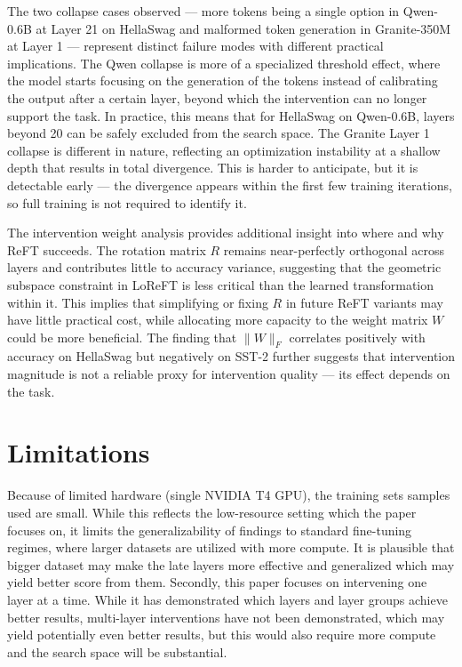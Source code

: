 \documentclass[conference]{IEEEtran}
\begin{document}
	The two collapse cases observed — more tokens being a single option in Qwen-0.6B at Layer 21 on HellaSwag and malformed token generation in Granite-350M at Layer 1 — represent distinct failure modes with different practical implications. The Qwen collapse is more of a specialized threshold effect, where the model starts focusing on the generation of the tokens instead of calibrating the output after a certain layer, beyond which the intervention can no longer support the task. In practice, this means that for HellaSwag on Qwen-0.6B, layers beyond 20 can be safely excluded from the search space. The Granite Layer 1 collapse is different in nature, reflecting an optimization instability at a shallow depth that results in total divergence. This is harder to anticipate, but it is detectable early — the divergence appears within the first few training iterations, so full training is not required to identify it.
	
	The intervention weight analysis provides additional insight into where and why ReFT succeeds. The rotation matrix $R$ remains near-perfectly orthogonal across layers and contributes little to accuracy variance, suggesting that the geometric subspace constraint in LoReFT is less critical than the learned transformation within it. This implies that simplifying or fixing $R$ in future ReFT variants may have little practical cost, while allocating more capacity to the weight matrix $W$ could be more beneficial. The finding that $\|W\|_F$ correlates positively with accuracy on HellaSwag but negatively on SST-2 further suggests that intervention magnitude is not a reliable proxy for intervention quality — its effect depends on the task.	
	
	\section{Limitations}
	
	Because of limited hardware (single NVIDIA T4 GPU), the training sets samples used are small. While this reflects the low-resource setting which the paper focuses on, it limits the generalizability of findings to standard fine-tuning regimes, where larger datasets are utilized with more compute. It is plausible that bigger dataset may make the late layers more effective and generalized which may yield better score from them. Secondly, this paper focuses on intervening one layer at a time. While it has demonstrated which layers and layer groups achieve better results, multi-layer interventions have not been demonstrated, which may yield potentially even better results, but this would also require more compute and the search space will be substantial.
	
\end{document}
